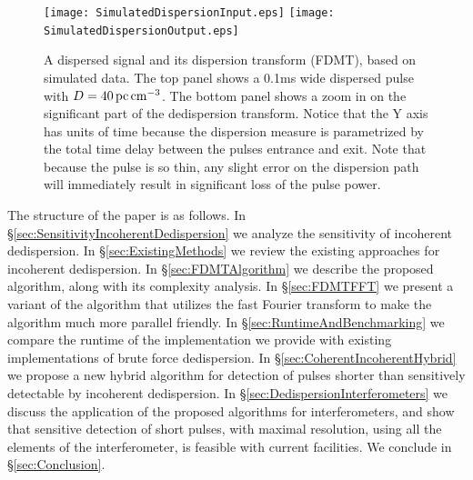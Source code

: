 \documentclass[iop]{emulateapj}
\begin{document}
\begin{figure}[h]
\texttt{[image: SimulatedDispersionInput.eps]}
\texttt{[image: SimulatedDispersionOutput.eps]}
\caption{A dispersed signal and its dispersion transform (FDMT), based on simulated data. The top panel shows a 0.1ms wide dispersed pulse with $D=40\, {\rm pc}\, {\rm cm}^{-3}$. The bottom panel shows a zoom in on the significant part of the dedispersion transform. Notice that the Y axis has units of time because the dispersion measure is parametrized by the total time delay between the pulses entrance and exit. Note that because the pulse is so thin, any slight error on the dispersion path will immediately result in significant loss of the pulse power.}\label{fig:InputOutput}
\end{figure} 


The structure of the paper is as follows.
In \S \ref{sec:SensitivityIncoherentDedispersion} we analyze the sensitivity of incoherent dedispersion.
In \S \ref{sec:ExistingMethods} we review the existing approaches for incoherent dedispersion. 
In \S \ref{sec:FDMTAlgorithm} we describe the proposed algorithm, along with its complexity analysis.
In \S \ref{sec:FDMTFFT} we present a variant of the algorithm that utilizes the fast Fourier transform to make the algorithm much more parallel friendly.
In \S \ref{sec:RuntimeAndBenchmarking} we compare the runtime of the implementation we provide with existing implementations of brute force dedispersion.
In \S \ref{sec:CoherentIncoherentHybrid} we propose a new hybrid algorithm for detection of pulses shorter than sensitively detectable by incoherent dedispersion.
In \S \ref{sec:DedispersionInterferometers} we discuss the application of the proposed algorithms for interferometers, and show that sensitive detection of short pulses, with maximal resolution, using all the elements of the interferometer, is feasible with current facilities.
We conclude in \S \ref{sec:Conclusion}.

\end{document}

